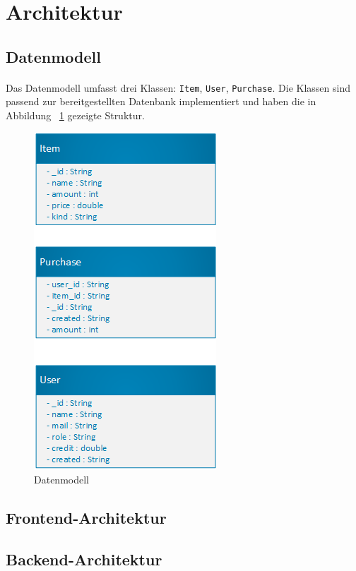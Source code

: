 \documentclass{scrartcl}
\begin{document}
	\section{Architektur} \label{architecture}
		\subsection{Datenmodell} \label{architecture.datamodel}
			\paragraph*{}
			Das Datenmodell umfasst drei Klassen: \texttt{Item}, \texttt{User}, \texttt{Purchase}. Die Klassen sind passend zur bereitgestellten Datenbank implementiert und haben die in Abbildung ~\ref{datamodel} gezeigte Struktur.
		
			\begin{figure}[!h]
				\label{datamodel}
				\centering
				\includegraphics[scale=0.5]{./figures/datamodel.png}
				\caption{Datenmodell}
			\end{figure}
		
		\subsection{Frontend-Architektur} \label{architecture.frontend}
		
		\subsection{Backend-Architektur} \label{architecture.backend}
\end{document}
